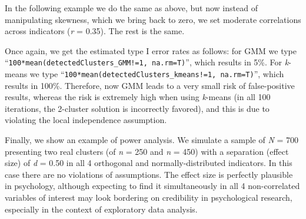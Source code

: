 \documentclass[
  man,floatsintext]{apa6}
\newenvironment{Shaded}{\begin{snugshade}}{\end{snugshade}}
\newcommand{\AttributeTok}[1]{\textcolor[rgb]{0.13,0.29,0.53}{#1}}
\newcommand{\CommentTok}[1]{\textcolor[rgb]{0.56,0.35,0.01}{\textit{#1}}}
\newcommand{\ConstantTok}[1]{\textcolor[rgb]{0.56,0.35,0.01}{#1}}
\newcommand{\ControlFlowTok}[1]{\textcolor[rgb]{0.13,0.29,0.53}{\textbf{#1}}}
\newcommand{\DecValTok}[1]{\textcolor[rgb]{0.00,0.00,0.81}{#1}}
\newcommand{\FloatTok}[1]{\textcolor[rgb]{0.00,0.00,0.81}{#1}}
\newcommand{\FunctionTok}[1]{\textcolor[rgb]{0.13,0.29,0.53}{\textbf{#1}}}
\newcommand{\NormalTok}[1]{#1}
\newcommand{\OtherTok}[1]{\textcolor[rgb]{0.56,0.35,0.01}{#1}}
\newcommand{\SpecialCharTok}[1]{\textcolor[rgb]{0.81,0.36,0.00}{\textbf{#1}}}
\begin{document}
In the following example we do the same as above, but now instead of manipulating skewness, which we bring back to zero, we set moderate correlations across indicators (\emph{r} = 0.35). The rest is the same.

\begin{Shaded}
\end{Shaded}

Once again, we get the estimated type I error rates as follows: for GMM we type ``\texttt{100*mean(detectedClusters\_GMM!=1,\ na.rm=T)}'', which results in 5\%. For \emph{k}-means we type ``\texttt{100*mean(detectedClusters\_kmeans!=1,\ na.rm=T)}'', which results in 100\%. Therefore, now GMM leads to a very small risk of false-positive results, whereas the risk is extremely high when using \emph{k}-means (in all 100 iterations, the 2-cluster solution is incorrectly favored), and this is due to violating the local independence assumption.

Finally, we show an example of power analysis. We simulate a sample of \emph{N} = 700 presenting two real clusters (of \emph{n} = 250 and \emph{n} = 450) with a separation (effect size) of \emph{d} = 0.50 in all 4 orthogonal and normally-distributed indicators. In this case there are no violations of assumptions. The effect size is perfectly plausible in psychology, although expecting to find it simultaneously in all 4 non-correlated variables of interest may look bordering on credibility in psychological research, especially in the context of exploratory data analysis.
\end{document}

